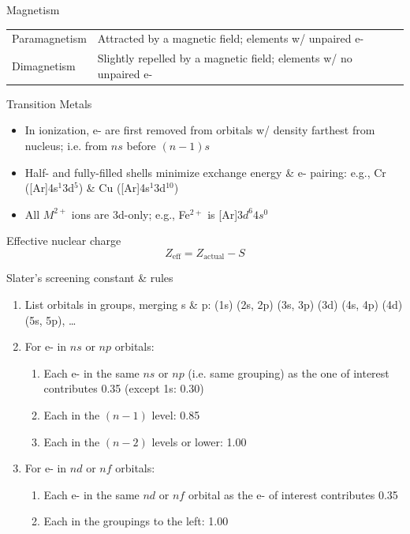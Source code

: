 \documentclass[10pt,landscape]{article}
\newcommand{\tableindent}{\hspace{1.5em}}
\begin{document}
\begin{multicols}{3}
Magnetism

\begin{tabular}{@{\tableindent}lp{5cm}@{}}
Paramagnetism & Attracted by a magnetic field; elements w/ unpaired e- \\
Dimagnetism & Slightly repelled by a magnetic field; elements w/ no unpaired e-
\end{tabular}

Transition Metals
\begin{itemize}
\item In ionization, e- are first removed from orbitals w/ density farthest from nucleus; i.e. from $ns$ before $(n-1)s$
\item Half- and fully-filled shells minimize exchange energy \& e- pairing: e.g., Cr ([Ar]4s$^1$3d$^{5}$) \& Cu  ([Ar]4s$^1$3d$^{10}$) 
\item All $M^{2+}$ ions are 3d-only; e.g.,  Fe$^{2+}$ is [Ar]$3d^{6}4s^0$
\end{itemize}  


Effective nuclear charge
\[ Z_\text{eff} = Z_\text{actual} - S \]

Slater's screening constant \& rules
\begin{enumerate}
\item List orbitals in groups, merging s \& p: (1s) (2s, 2p) (3s, 3p) (3d) (4s, 4p) (4d) (5s, 5p), \ldots 
\item For e- in $ns$ or $np$ orbitals:

	\begin{enumerate}
	\item Each e- in the same $ns$ or $np$ (i.e. same grouping) as the one of interest contributes 0.35 (except 1s: 0.30)
	\item Each in the $(n-1)$ level: 0.85
	\item Each in the $(n-2)$ levels or lower: 1.00
	\end{enumerate}

\item For e- in $nd$ or $nf$ orbitals:

	\begin{enumerate}
	\item Each e- in the same $nd$ or $nf$  orbital as the e- of interest contributes 0.35
	\item Each in the groupings to the left: 1.00
	\end{enumerate}

\end{enumerate}


\end{multicols}
\end{document}
